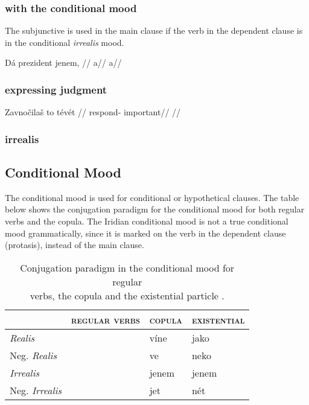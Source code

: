 \subsubsection{with the conditional mood}
\par The subjunctive is used in the main clause if the verb in the dependent clause is in the conditional \textit{irrealis} mood.

\pex
\begingl
\gla Dá prezident jenem, //
\glb a//
\glft a//
\endgl
\xe

\subsubsection{expressing judgment}

\pex
\begingl
\gla Zavnočilaš to tévét //
\glb respond-  important//
\glft {}//
\endgl
\xe

\subsubsection{irrealis}

\subsection{Conditional Mood}\label{sec:conditional}
\par The conditional mood is used for conditional or hypothetical clauses. The table below shows the conjugation paradigm for the conditional mood for both regular verbs and the copula. The Iridian conditional mood is not a true conditional mood grammatically, since it is marked on the verb in the dependent clause (protasis), instead of the main clause.

\begin{table}[h!]
	\small
	\caption{Conjugation paradigm in the conditional mood for regular \\verbs, the copula and the existential particle .}\medskip
	\begin{tabu} to 0.9 \textwidth	{Y[1.3]Y[1.3]YY}
		\toprule
		&{\scshape regular verbs} & {\scshape copula} & {\scshape existential}\\
		\midrule

		\textit{Realis} 				& &víne & jako\\
		Neg. \textit{Realis}		&&ve&neko\\

		\textit{Irrealis} 			& & jenem & jenem\\
		Neg. \textit{Irrealis} 	& & jet & nét\\
		\bottomrule
	\end{tabu}
\end{table}


